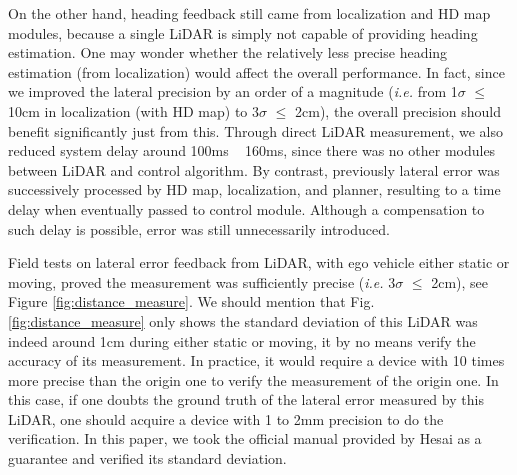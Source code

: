 \documentclass[letterpaper, 10 pt, conference]{ieeeconf}
\begin{document}
On the other hand, heading feedback still came from localization and HD map modules, because a single LiDAR is simply not capable of providing heading estimation. One may wonder whether the relatively less precise heading estimation (from localization) would affect the overall performance. In fact, since we improved the lateral precision by an order of a magnitude (\textit{i.e.} from 1$\sigma$ $\leq$ 10cm in localization (with HD map) to 3$\sigma$ $\leq$ 2cm), the overall precision should benefit significantly just from this. Through direct LiDAR measurement, we also reduced system delay around 100ms ~ 160ms, since there was no other modules between LiDAR and control algorithm. By contrast, previously lateral error was successively processed by HD map, localization, and planner, resulting to a time delay when eventually passed to control module. Although a compensation to such delay is possible, error was still unnecessarily introduced.

Field tests on lateral error feedback from LiDAR, with ego vehicle either static or moving, proved the measurement was sufficiently precise (\textit{i.e.} 3$\sigma$ $\leq$ 2cm), see Figure \ref{fig:distance_measure}. We should mention that Fig. \ref{fig:distance_measure} only shows the standard deviation of this LiDAR was indeed around 1cm during either static or moving, it by no means verify the accuracy of its measurement. In practice, it would require a device with 10 times more precise than the origin one to verify the measurement of the origin one. In this case, if one doubts the ground truth of the lateral error measured by this LiDAR, one should acquire a device with 1 to 2mm precision to do the verification. In this paper, we took the official manual provided by Hesai as a guarantee and verified its standard deviation. 
\end{document}

